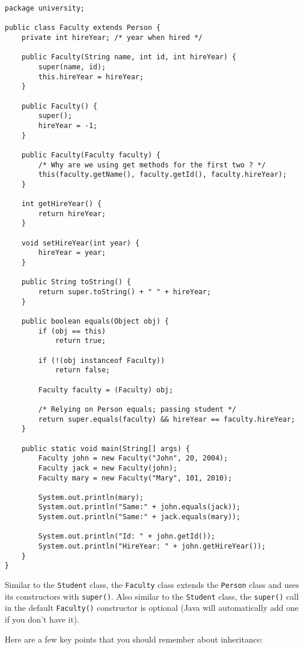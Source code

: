 \begin{lstlisting}
package university;

public class Faculty extends Person {
	private int hireYear; /* year when hired */

	public Faculty(String name, int id, int hireYear) {
		super(name, id);
		this.hireYear = hireYear;
	}

	public Faculty() {
		super();
		hireYear = -1;
	}

	public Faculty(Faculty faculty) {
		/* Why are we using get methods for the first two ? */
		this(faculty.getName(), faculty.getId(), faculty.hireYear);
	}

	int getHireYear() {
		return hireYear;
	}

	void setHireYear(int year) {
		hireYear = year;
	}

	public String toString() {
		return super.toString() + " " + hireYear;
	}

	public boolean equals(Object obj) {
		if (obj == this)
			return true;

		if (!(obj instanceof Faculty))
			return false;

		Faculty faculty = (Faculty) obj;

		/* Relying on Person equals; passing student */
		return super.equals(faculty) && hireYear == faculty.hireYear;
	}

	public static void main(String[] args) {
		Faculty john = new Faculty("John", 20, 2004);
		Faculty jack = new Faculty(john);
		Faculty mary = new Faculty("Mary", 101, 2010);

		System.out.println(mary);
		System.out.println("Same:" + john.equals(jack));
		System.out.println("Same:" + jack.equals(mary));

		System.out.println("Id: " + john.getId());
		System.out.println("HireYear: " + john.getHireYear());
	}
}
\end{lstlisting}


Similar to the \verb!Student! class, the \verb!Faculty! class extends the \verb!Person! class and uses its constructors with \verb!super()!. Also similar to the \verb!Student! class, the \verb!super()! call in the default \verb!Faculty()! constructor is optional (Java will automatically add one if you don't have it). 



Here are a few key points that you should remember about inheritance:

